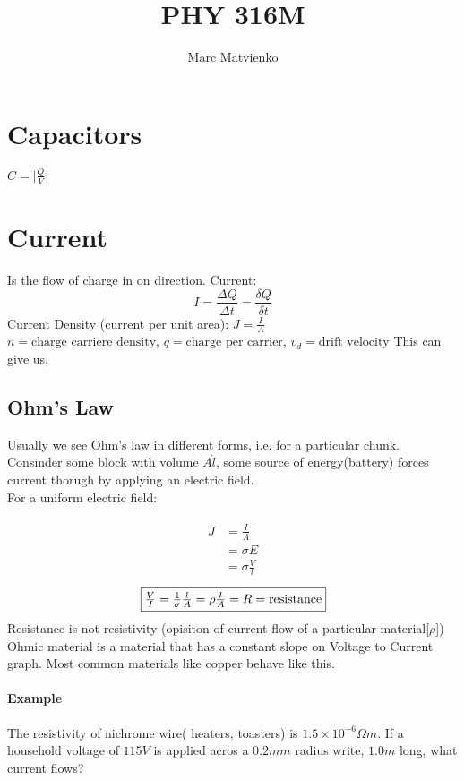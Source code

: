 \documentclass{article}
\title{PHY 316M}
\author{Marc Matvienko}
\begin{document}
    \maketitle %
    
    \section{Capacitors}
    $C = \lvert\frac{Q}{V}\rvert$

    \section{Current}
    Is the flow of charge in on direction.
    Current: $$I=\frac{\Delta Q}{\Delta t} =\frac{\delta Q}{\delta t}$$
    Current Density (current per unit area): $J = \frac{I}{A}$\\
    $n = \text{charge carriere density}$, $q = \text{charge per carrier}$, $v_d = \text{drift velocity}$
    This can give us, 
    
    \subsection{Ohm's Law}
    Usually we see Ohm's law in different forms, i.e. for a particular chunk.\\
    Consinder some block with volume $A\dot l$, some source of energy(battery) forces current thorugh by applying an electric field.\\
    For a uniform electric field: 
    
    \begin{align*}
        \begin{split}
            J &= \frac{I}{A} \\
            &= \sigma E \\
            &= \sigma \frac{V}{l}
        \end{split}
    \end{align*}
    $$\boxed{$$\frac{V}{I} = \frac{1}{\sigma} \frac{l}{A} = \rho \frac{l}{A} = R = \text{resistance}$$}$$
    Resistance is not resistivity (opisiton of current flow of a particular material[$\rho$])
    Ohmic material is a material that has a constant slope on Voltage to Current graph. Most common materials like copper behave like this.
    \paragraph{Example} The resistivity of nichrome wire( heaters, toasters) is $1.5 \times 10^{-6}\Omega m$. 
    If a household voltage of $115V$ is applied acros a $0.2mm$ radius write, $1.0m$ long, what current flows?
\end{document}
